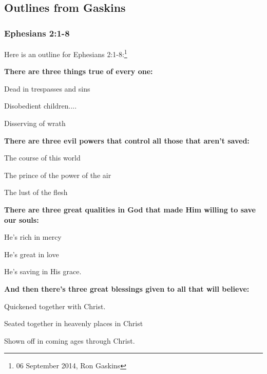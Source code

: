 \subsection{Outlines from Gaskins}

\subsubsection{Ephesians 2:1-8}
Here is an outline for Ephesians 2:1-8:\footnote{06 September 2014, Ron Gaskins}
\begin{compactenum}[I.]
    \item \textbf{There are three things true of every one:}
    \begin{compactenum}[A.]
    	\item Dead in trespasses and sins
    	\item Disobedient children....
    	\item Disserving of wrath
	\end{compactenum}
    \item \textbf{There are three evil powers that control all those that aren’t saved:}
    \begin{compactenum}[A.]
    	\item The course of this world
    	\item The prince of the power of the air
    	\item The lust of the flesh
	\end{compactenum}
    \item \textbf{There are three great qualities in God that made Him willing to save our souls:}
    \begin{compactenum}[A.]
    	\item He’s rich in mercy
    	\item He’s great in love
    	\item He’s saving in His grace.
	\end{compactenum}
    \item \textbf{And then there’s three great blessings given to all that will believe:}
    \begin{compactenum}[A.]
    	\item Quickened together with Christ.
    	\item Seated together in heavenly places in Christ
    	\item Shown off in coming ages through Christ.
	\end{compactenum}
\end{compactenum}

